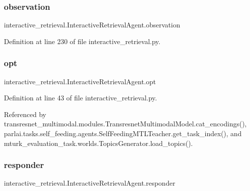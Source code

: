 \subsubsection{\texorpdfstring{observation}{observation}}
{\footnotesize\ttfamily interactive\+\_\+retrieval.\+Interactive\+Retrieval\+Agent.\+observation}



Definition at line 230 of file interactive\+\_\+retrieval.\+py.

\mbox{\label{classinteractive__retrieval_1_1InteractiveRetrievalAgent_a223bbe2d336caaeec4a45acb1e9f6ecd}} 
\subsubsection{\texorpdfstring{opt}{opt}}
{\footnotesize\ttfamily interactive\+\_\+retrieval.\+Interactive\+Retrieval\+Agent.\+opt}



Definition at line 43 of file interactive\+\_\+retrieval.\+py.



Referenced by transresnet\+\_\+multimodal.\+modules.\+Transresnet\+Multimodal\+Model.\+cat\+\_\+encodings(), parlai.\+tasks.\+self\+\_\+feeding.\+agents.\+Self\+Feeding\+M\+T\+L\+Teacher.\+get\+\_\+task\+\_\+index(), and mturk\+\_\+evaluation\+\_\+task.\+worlds.\+Topics\+Generator.\+load\+\_\+topics().

\mbox{\label{classinteractive__retrieval_1_1InteractiveRetrievalAgent_ad86a617fdd066c0259091c996b1055e3}} 
\subsubsection{\texorpdfstring{responder}{responder}}
{\footnotesize\ttfamily interactive\+\_\+retrieval.\+Interactive\+Retrieval\+Agent.\+responder}



